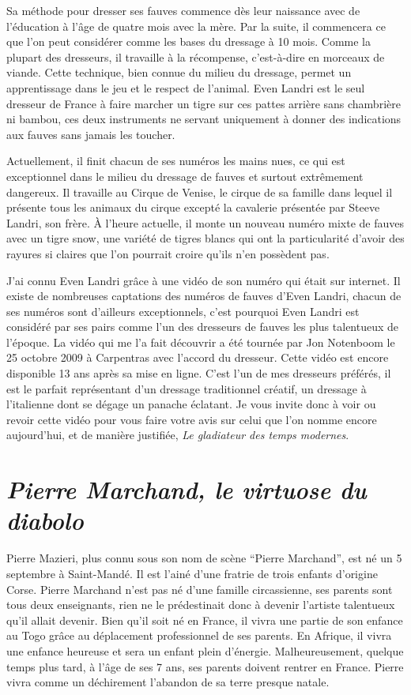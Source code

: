 Sa méthode pour dresser ses fauves commence dès leur naissance avec de l'éducation à l'âge de quatre mois avec la mère. Par la suite, il commencera ce que l'on peut considérer comme les bases du dressage à 10 mois. Comme la plupart des dresseurs, il travaille à la récompense, c'est-à-dire en morceaux de viande. Cette technique, bien connue du milieu du dressage, permet un apprentissage dans le jeu et le respect de l'animal. Even Landri est le seul dresseur de France à faire marcher un tigre sur ces pattes arrière sans chambrière ni bambou, ces deux instruments ne servant uniquement à donner des indications aux fauves sans jamais les toucher.

Actuellement, il finit chacun de ses numéros les mains nues, ce qui est exceptionnel dans le milieu du dressage de fauves et surtout extrêmement dangereux. Il travaille au Cirque de Venise, le cirque de sa famille dans lequel il présente tous les animaux du cirque excepté la cavalerie présentée par Steeve Landri, son frère. À l'heure actuelle, il monte un nouveau numéro mixte de fauves avec un tigre snow, une variété de tigres blancs qui ont la particularité d'avoir des rayures si claires que l'on pourrait croire qu'ils n'en possèdent pas.

J'ai connu Even Landri grâce à une vidéo de son numéro qui était sur internet. Il existe de nombreuses captations des numéros de fauves d'Even Landri, chacun de ses numéros sont d'ailleurs exceptionnels, c'est pourquoi Even Landri est considéré par ses pairs comme l'un des dresseurs de fauves les plus talentueux de l'époque. La vidéo qui me l'a fait découvrir a été tournée par Jon Notenboom le 25 octobre 2009 à Carpentras avec l'accord du dresseur. Cette vidéo est encore disponible 13 ans après sa mise en ligne. C'est l'un de mes dresseurs préférés, il est le parfait représentant d'un dressage traditionnel créatif, un dressage à l'italienne dont se dégage un panache éclatant. Je vous invite donc à voir ou revoir cette vidéo pour vous faire votre avis sur celui que l’on nomme encore aujourd'hui, et de manière justifiée, \textit{Le gladiateur des temps modernes}.

\section*{\textit{Pierre Marchand, le virtuose du diabolo}}
{}

Pierre Mazieri, plus connu sous son nom de scène ``Pierre Marchand'', est né un 5 septembre à Saint-Mandé. Il est l'ainé d'une fratrie de trois enfants d'origine Corse. Pierre Marchand n'est pas né d'une famille circassienne, ses parents sont tous deux enseignants, rien ne le prédestinait donc à devenir l'artiste talentueux qu'il allait devenir. Bien qu'il soit né en France, il vivra une partie de son enfance au Togo grâce au déplacement professionnel de ses parents. En Afrique, il vivra une enfance heureuse et sera un enfant plein d'énergie. Malheureusement, quelque temps plus tard, à l'âge de ses 7 ans, ses parents doivent rentrer en France. Pierre vivra comme un déchirement l'abandon de sa terre presque natale.

